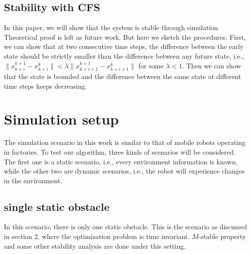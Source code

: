 \documentclass{ifacconf}
\begin{document}
\subsection{Stability with CFS}
In this paper, we will show that the system is stable through simulation. Theoretical proof is left as future work. But here we sketch the procedures. First, we can show that at two consecutive time steps, the difference between the early state should be strictly smaller than the difference between any future state, i.e., $\|x_{k+i}^{k+1}-x_{k+i}^k\|<\lambda\|x_{k+i+1}^{k+1}-x_{k+i+1}^k\|$ for some $\lambda<1$. Then we can show that the state is bounded and the difference between the same state at different time steps keeps decreasing.
%
%

\section{Simulation setup}

The simulation scenario in this work is similar to that of mobile robots operating in factories. To test our algorithm, three kinds of scenarios will be considered. The first one is a static scenario, i.e., every environment information is known, while the other two are dynamic scenarios, i.e., the robot will experience changes in the environment.

\subsection{single static obstacle}
In this scenario, there is  only one static obstacle. This is the scenario as discussed in section 2, where the optimization problem is time invariant. $M$-stable property and some other stability analysis are done under this setting.
\end{document}

